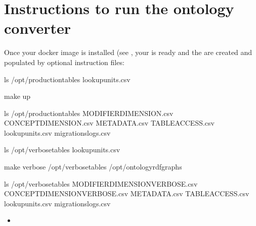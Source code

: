 \documentclass[letterpaper,10pt,english]{sphinxmanual}
\begin{document}
\section{Instructions to run the ontology converter}
\label{\detokenize{run_ontology:instructions-to-run-the-ontology-converter}}\label{\detokenize{run_ontology:run-ontology}}\label{\detokenize{run_ontology::doc}}
Once your docker image is installed (see {\hyperref[\detokenize{installation:installation}]{}}, your {\hyperref[\detokenize{configuration:configuration}]{}} is ready and the {\hyperref[\detokenize{structure:structure}]{}} are created and populated by optional instruction files:
\def\sphinxLiteralBlockLabel{\label{\detokenize{run_ontology:id1}}}
%
\begin{sphinxVerbatim}[commandchars=\\\{\}]
\PYGZdl{} ls /opt/production\PYGZus{}tables
       lookup\PYGZus{}units.csv

\PYGZdl{} make up


\PYGZdl{} ls /opt/production\PYGZus{}tables
       MODIFIER\PYGZus{}DIMENSION.csv CONCEPT\PYGZus{}DIMENSION.csv
       METADATA.csv TABLE\PYGZus{}ACCESS.csv
       lookup\PYGZus{}units.csv migrations\PYGZus{}logs.csv
\end{sphinxVerbatim}
\sphinxresetverbatimhllines
{}
\def\sphinxLiteralBlockLabel{\label{\detokenize{run_ontology:id2}}}
%
\begin{sphinxVerbatim}[commandchars=\\\{\}]
\PYGZdl{} ls /opt/verbose\PYGZus{}tables
       lookup\PYGZus{}units.csv

\PYGZdl{} make verbose /opt/verbose\PYGZus{}tables /opt/ontology\PYGZus{}rdf\PYGZus{}graphs

\PYGZdl{} ls /opt/verbose\PYGZus{}tables
       MODIFIER\PYGZus{}DIMENSION\PYGZus{}VERBOSE.csv CONCEPT\PYGZus{}DIMENSION\PYGZus{}VERBOSE.csv
       METADATA.csv TABLE\PYGZus{}ACCESS.csv
       lookup\PYGZus{}units.csv migrations\PYGZus{}logs.csv
\end{sphinxVerbatim}
\sphinxresetverbatimhllines
\begin{itemize}
\item {} 

\end{itemize}



\renewcommand{\indexname}{Index}
\printindex
\end{document}
